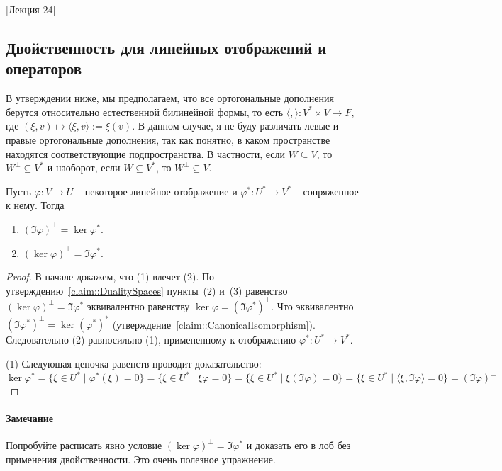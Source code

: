 [Лекция 24]

\subsection{Двойственность для линейных отображений и операторов}

В утверждении ниже, мы предполагаем, что все ортогональные дополнения берутся относительно естественной билинейной формы, то есть $\langle, \rangle\colon V^*\times V\to F$, где $(\xi, v)\mapsto \langle \xi, v\rangle := \xi(v)$. В данном случае, я не буду различать левые и правые ортогональные дополнения, так как понятно, в каком пространстве находятся соответствующие подпространства. В частности, если $W\subseteq V$, то $W^\bot\subseteq V^*$ и наоборот, если $W\subseteq V^*$, то $W^\bot \subseteq V$.

\begin{claim}\label{claim::Fredholm}
Пусть $\varphi\colon V\to U$ -- некоторое линейное отображение и $\varphi^*\colon U^*\to V^*$ -- сопряженное к нему. Тогда
\begin{enumerate}
\item $(\Im \varphi)^\bot = \ker \varphi^*$.
\item $(\ker \varphi)^\bot = \Im \varphi^*$.
\end{enumerate}
\end{claim}
\begin{proof}
В начале докажем, что (1) влечет (2). По утверждению~\ref{claim::DualitySpaces} пункты~(2) и~(3) равенство $(\ker \varphi)^\bot = \Im \varphi^*$ эквивалентно равенству $\ker \varphi = (\Im \varphi^*)^\bot$. Что эквивалентно $(\Im \varphi^*)^\bot = \ker(\varphi^*)^*$ (утверждение~\ref{claim::CanonicalIsomorphism}). Следовательно (2) равносильно (1), примененному к отображению $\varphi^*\colon U^*\to V^*$.

(1) Следующая цепочка равенств проводит доказательство:
\[
\ker\varphi^* =\{\xi \in U^*\mid \varphi^*(\xi) = 0\} = \{\xi \in U^*\mid \xi \varphi = 0\} = \{\xi\in U^*\mid \xi(\Im \varphi) = 0\} = \{\xi\in U^*\mid \langle \xi, \Im\varphi\rangle = 0\} = (\Im \varphi)^\bot
\]
\end{proof}

\paragraph{Замечание}
Попробуйте расписать явно условие $(\ker \varphi)^\bot = \Im \varphi^*$ и доказать его в лоб без применения двойственности. Это очень полезное упражнение.

